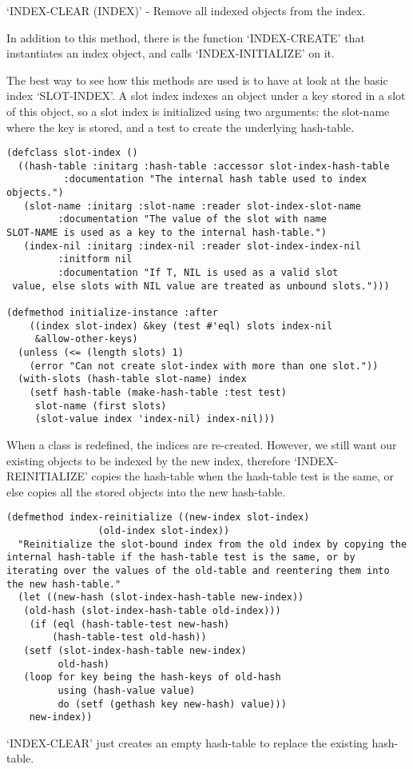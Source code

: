 `INDEX-CLEAR (INDEX)' - Remove all indexed objects from the index.

In addition to this method, there is the function `INDEX-CREATE'
that instantiates an index object, and calls `INDEX-INITIALIZE' on
it.

The best way to see how this methods are used is to have at look
at the basic index `SLOT-INDEX'. A slot index indexes an object
under a key stored in a slot of this object, so a slot index is
initialized using two arguments: the slot-name where the key is
stored, and a test to create the underlying hash-table.

\begin{Verbatim}[fontsize=\small,frame=leftline,framerule=0.9mm,rulecolor=\color{gray},framesep=5.1mm,xleftmargin=5mm,fontfamily=cmtt]
(defclass slot-index ()
  ((hash-table :initarg :hash-table :accessor slot-index-hash-table
          :documentation "The internal hash table used to index
objects.")
   (slot-name :initarg :slot-name :reader slot-index-slot-name
         :documentation "The value of the slot with name
SLOT-NAME is used as a key to the internal hash-table.")
   (index-nil :initarg :index-nil :reader slot-index-index-nil
         :initform nil
         :documentation "If T, NIL is used as a valid slot
 value, else slots with NIL value are treated as unbound slots.")))

(defmethod initialize-instance :after
    ((index slot-index) &key (test #'eql) slots index-nil
     &allow-other-keys)
  (unless (<= (length slots) 1)
    (error "Can not create slot-index with more than one slot."))
  (with-slots (hash-table slot-name) index
    (setf hash-table (make-hash-table :test test)
     slot-name (first slots)
     (slot-value index 'index-nil) index-nil)))
\end{Verbatim}
When a class is redefined, the indices are re-created. However, we
still want our existing objects to be indexed by the new index,
therefore `INDEX-REINITIALIZE' copies the hash-table when the
hash-table test is the same, or else copies all the stored objects
into the new hash-table.

\begin{Verbatim}[fontsize=\small,frame=leftline,framerule=0.9mm,rulecolor=\color{gray},framesep=5.1mm,xleftmargin=5mm,fontfamily=cmtt]
(defmethod index-reinitialize ((new-index slot-index)
                (old-index slot-index))
  "Reinitialize the slot-bound index from the old index by copying the
internal hash-table if the hash-table test is the same, or by
iterating over the values of the old-table and reentering them into
the new hash-table."
  (let ((new-hash (slot-index-hash-table new-index))
   (old-hash (slot-index-hash-table old-index)))
    (if (eql (hash-table-test new-hash)
        (hash-table-test old-hash))
   (setf (slot-index-hash-table new-index)
         old-hash)
   (loop for key being the hash-keys of old-hash
         using (hash-value value)
         do (setf (gethash key new-hash) value)))
    new-index))
\end{Verbatim}
`INDEX-CLEAR' just creates an empty hash-table to replace the
existing hash-table.

